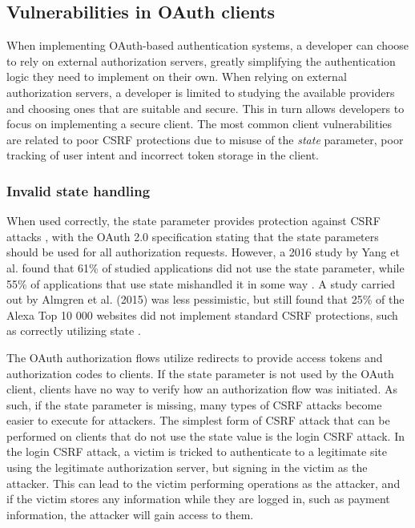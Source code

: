 \subsection{Vulnerabilities in OAuth clients}
When implementing OAuth-based authentication systems, a developer can choose to rely on external authorization servers, greatly simplifying the authentication logic they need to implement on their own.
When relying on external authorization servers, a developer is limited to studying the available providers and choosing ones that are suitable and secure.
This in turn allows developers to focus on implementing a secure client.
The most common client vulnerabilities are related to poor CSRF protections due to misuse of the \textit{state} parameter, poor tracking of user intent and incorrect token storage in the client.

\subsubsection{Invalid state handling}
\label{sec:vulnerabilities-state}
When used correctly, the state parameter provides protection against CSRF attacks \citep{almgren_more_2015}, with the OAuth 2.0 specification stating that the state parameters should be used for all authorization requests.
However, a 2016 study by Yang et al. found that 61\% of studied applications did not use the state parameter, while 55\% of applications that use state mishandled it in some way \citep{yang_model-based_2016}.
A study carried out by Almgren et al. (2015) was less pessimistic, but still found that 25\% of the Alexa Top 10 000 websites did not implement standard CSRF protections, such as correctly utilizing state \citep{almgren_more_2015}.

The OAuth authorization flows utilize redirects to provide access tokens and authorization codes to clients.
If the state parameter is not used by the OAuth client, clients have no way to verify how an authorization flow was initiated.
As such, if the state parameter is missing, many types of CSRF attacks become easier to execute for attackers.
The simplest form of CSRF attack that can be performed on clients that do not use the state value is the login CSRF attack.
In the login CSRF attack, a victim is tricked to authenticate to a legitimate site using the legitimate authorization server, but signing in the victim as the attacker.
This can lead to the victim performing operations as the attacker, and if the victim stores any information while they are logged in, such as payment information, the attacker will gain access to them.

